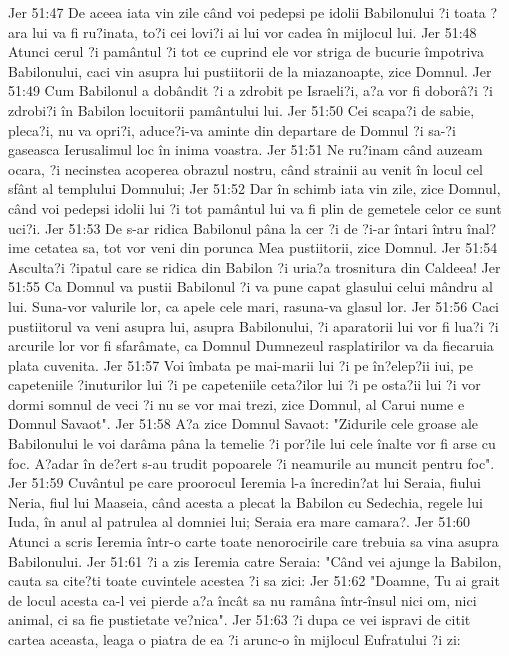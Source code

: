 Jer 51:47  De aceea iata vin zile când voi pedepsi pe idolii Babilonului ?i toata ?ara lui va fi ru?inata, to?i cei lovi?i ai lui vor cadea în mijlocul lui.
Jer 51:48  Atunci cerul ?i pamântul ?i tot ce cuprind ele vor striga de bucurie împotriva Babilonului, caci vin asupra lui pustiitorii de la miazanoapte, zice Domnul.
Jer 51:49  Cum Babilonul a dobândit ?i a zdrobit pe Israeli?i, a?a vor fi doborâ?i ?i zdrobi?i în Babilon locuitorii pamântului lui.
Jer 51:50  Cei scapa?i de sabie, pleca?i, nu va opri?i, aduce?i-va aminte din departare de Domnul ?i sa-?i gaseasca Ierusalimul loc în inima voastra.
Jer 51:51  Ne ru?inam când auzeam ocara, ?i necinstea acoperea obrazul nostru, când strainii au venit în locul cel sfânt al templului Domnului;
Jer 51:52  Dar în schimb iata vin zile, zice Domnul, când voi pedepsi idolii lui ?i tot pamântul lui va fi plin de gemetele celor ce sunt uci?i.
Jer 51:53  De s-ar ridica Babilonul pâna la cer ?i de ?i-ar întari întru înal?ime cetatea sa, tot vor veni din porunca Mea pustiitorii, zice Domnul.
Jer 51:54  Asculta?i ?ipatul care se ridica din Babilon ?i uria?a trosnitura din Caldeea!
Jer 51:55  Ca Domnul va pustii Babilonul ?i va pune capat glasului celui mândru al lui. Suna-vor valurile lor, ca apele cele mari, rasuna-va glasul lor.
Jer 51:56  Caci pustiitorul va veni asupra lui, asupra Babilonului, ?i aparatorii lui vor fi lua?i ?i arcurile lor vor fi sfarâmate, ca Domnul Dumnezeul rasplatirilor va da fiecaruia plata cuvenita.
Jer 51:57  Voi îmbata pe mai-marii lui ?i pe în?elep?ii iui, pe capeteniile ?inuturilor lui ?i pe capeteniile ceta?ilor lui ?i pe osta?ii lui ?i vor dormi somnul de veci ?i nu se vor mai trezi, zice Domnul, al Carui nume e Domnul Savaot".
Jer 51:58  A?a zice Domnul Savaot: "Zidurile cele groase ale Babilonului le voi darâma pâna la temelie ?i por?ile lui cele înalte vor fi arse cu foc. A?adar în de?ert s-au trudit popoarele ?i neamurile au muncit pentru foc".
Jer 51:59  Cuvântul pe care proorocul Ieremia l-a încredin?at lui Seraia, fiului Neria, fiul lui Maaseia, când acesta a plecat la Babilon cu Sedechia, regele lui Iuda, în anul al patrulea al domniei lui; Seraia era mare camara?.
Jer 51:60  Atunci a scris Ieremia într-o carte toate nenorocirile care trebuia sa vina asupra Babilonului.
Jer 51:61  ?i a zis Ieremia catre Seraia: "Când vei ajunge la Babilon, cauta sa cite?ti toate cuvintele acestea ?i sa zici:
Jer 51:62  "Doamne, Tu ai grait de locul acesta ca-l vei pierde a?a încât sa nu ramâna într-însul nici om, nici animal, ci sa fie pustietate ve?nica".
Jer 51:63  ?i dupa ce vei ispravi de citit cartea aceasta, leaga o piatra de ea ?i arunc-o în mijlocul Eufratului ?i zi:
